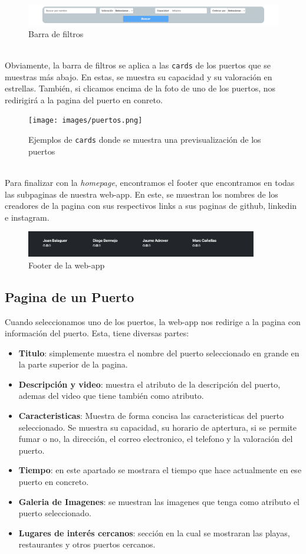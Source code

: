 \documentclass{article}
\begin{document}
\begin{figure}[ht]
    \centering
    \includegraphics[width=1.0\textwidth]{images/filtros.png}
    \caption{Barra de filtros}
\end{figure}
\\Obviamente, la barra de filtros se aplica a las \texttt{cards} de los puertos que se muestras más abajo. En estas, se muestra su capacidad y su valoración en estrellas. También, si clicamos encima de la foto de uno de los puertos, nos redirigirá a la pagina del puerto en conreto.
\begin{figure}[ht]
    \centering
    \texttt{[image: images/puertos.png]}
    \caption{Ejemplos de \texttt{cards} donde se muestra una previsualización de los puertos}
\end{figure}
\\Para finalizar con la \textit{homepage}, encontramos el footer que encontramos en todas las subpaginas de nuestra web-app. En este, se muestran los nombres de los creadores de la pagina con sus respectivos links a sus paginas de github, linkedin e instagram.
\begin{figure}[ht]
    \centering
    \includegraphics[width=0.9\textwidth]{images/footer.png}
    \caption{Footer de la web-app}
\end{figure}

\subsection{Pagina de un Puerto}
Cuando seleccionamos uno de los puertos, la web-app nos redirige a la pagina con información del puerto. Esta, tiene diversas partes:
\begin{itemize}
    \item \textbf{Titulo}: simplemente muestra el nombre del puerto seleccionado en grande en la parte superior de la pagina.
    \item \textbf{Descripción y video}: muestra el atributo de la descripción del puerto, ademas del video que tiene también como atributo.
    \item \textbf{Caracteristicas}: Muestra de forma concisa las caracteristicas del puerto seleccionado. Se muestra su capacidad, su horario de aptertura, si se permite fumar o no, la dirección, el correo electronico, el telefono y la valoración del puerto.
    \item \textbf{Tiempo}: en este apartado se mostrara el tiempo que hace actualmente en ese puerto en concreto.
    \item \textbf{Galeria de Imagenes}: se muestran las imagenes que tenga como atributo el puerto seleccionado.
    \item \textbf{Lugares de interés cercanos}: sección en la cual se mostraran las playas, restaurantes y otros puertos cercanos.
\end{itemize}
\end{document}
